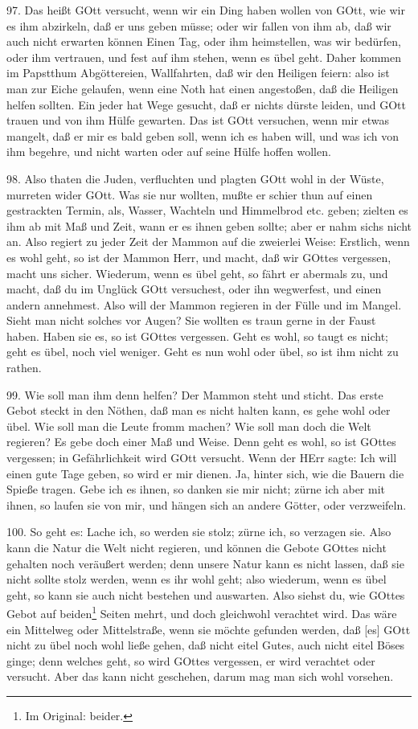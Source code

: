 97. Das heißt GOtt versucht, wenn wir ein Ding haben wollen von GOtt, wie wir es ihm abzirkeln, daß er uns geben müsse; oder wir fallen von ihm ab, daß wir auch nicht erwarten können Einen Tag, oder ihm heimstellen, was wir bedürfen, oder ihm vertrauen, und fest auf ihm stehen, wenn es übel geht. Daher kommen im Papstthum Abgöttereien, Wallfahrten, daß wir den Heiligen feiern: also ist man zur Eiche gelaufen, wenn eine Noth hat einen angestoßen, daß die Heiligen helfen sollten. Ein jeder hat Wege gesucht, daß er nichts dürste leiden, und GOtt trauen und von ihm Hülfe gewarten. Das ist GOtt versuchen, wenn mir etwas mangelt, daß er mir es bald geben soll, wenn ich es haben will, und was ich von ihm begehre, und nicht warten oder auf seine Hülfe hoffen wollen.

98. Also thaten die Juden, verfluchten und plagten GOtt wohl in der Wüste, murreten wider GOtt. Was sie nur wollten, mußte er schier thun auf einen gestrackten Termin, als, Wasser, Wachteln und Himmelbrod etc. geben; zielten es ihm ab mit Maß und Zeit, wann er es ihnen geben sollte; aber er nahm sichs nicht an. Also regiert zu jeder Zeit der Mammon auf die zweierlei Weise: Erstlich, wenn es wohl geht, so ist der Mammon Herr, und macht, daß wir GOttes vergessen, macht uns sicher. Wiederum, wenn es übel geht, so fährt er abermals zu, und macht, daß du im Unglück GOtt versuchest, oder ihn wegwerfest, und einen andern annehmest. Also will der Mammon regieren in der Fülle und im Mangel. Sieht man nicht solches vor Augen? Sie wollten es traun gerne in der Faust haben. Haben sie es, so ist GOttes vergessen. Geht es wohl, so taugt es nicht; geht es übel, noch viel weniger. Geht es nun wohl oder übel, so ist ihm nicht zu rathen.

99. Wie soll man ihm denn helfen? Der Mammon steht und sticht. Das erste Gebot steckt in den Nöthen, daß man es nicht halten kann, es gehe wohl oder übel. Wie soll man die Leute fromm machen? Wie soll man doch die Welt regieren? Es gebe doch einer Maß und Weise. Denn geht es wohl, so ist GOttes vergessen; in Gefährlichkeit wird GOtt versucht. Wenn der HErr sagte: Ich will einen gute Tage geben, so wird er mir dienen. Ja, hinter sich, wie die Bauern die Spieße tragen. Gebe ich es ihnen, so danken sie mir nicht; zürne ich aber mit ihnen, so laufen sie von mir, und hängen sich an andere Götter, oder verzweifeln.

100. So geht es: Lache ich, so werden sie
stolz; zürne ich, so verzagen sie. Also kann die Natur die Welt nicht regieren, und können die Gebote GOttes nicht gehalten noch veräußert werden; denn unsere Natur kann es nicht lassen, daß sie nicht sollte stolz werden, wenn es ihr wohl geht; also wiederum, wenn es übel geht, so kann sie auch nicht bestehen und auswarten. Also siehst du, wie GOttes Gebot auf beiden\footnote{Im Original: beider.} Seiten mehrt, und doch gleichwohl verachtet wird. Das wäre ein Mittelweg oder Mittelstraße, wenn sie möchte gefunden werden, daß [es] GOtt nicht zu übel noch wohl ließe gehen, daß nicht eitel Gutes, auch nicht eitel Böses ginge; denn welches geht, so wird GOttes vergessen, er wird verachtet oder versucht. Aber das kann nicht geschehen, darum mag man sich wohl vorsehen.

